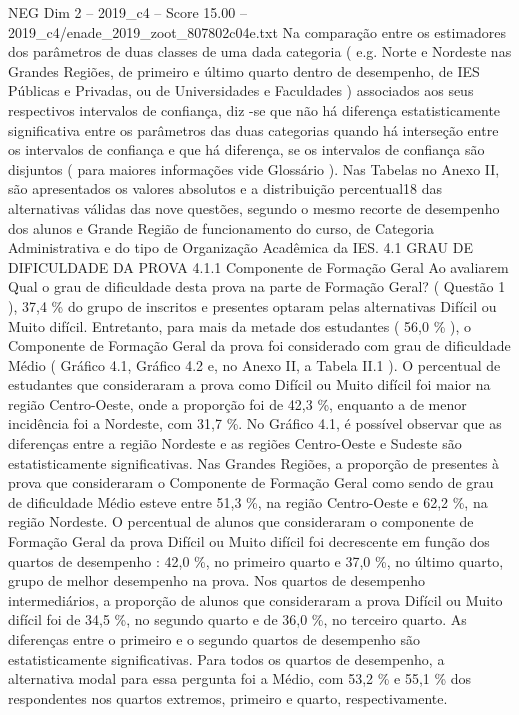 \begin{textsample}{NEG Dim 2 – 2019\_c4 – Score 15.00 – 2019\_c4/enade\_2019\_zoot\_807802c04e.txt}
Na comparação entre os estimadores dos parâmetros de duas classes de uma dada categoria ( e.g.
Norte e Nordeste nas Grandes Regiões, de primeiro e último quarto dentro de desempenho, de IES Públicas e Privadas, ou de Universidades e Faculdades ) associados aos seus respectivos intervalos de confiança, diz -se que não há diferença estatisticamente significativa entre os parâmetros das duas categorias quando há interseção entre os intervalos de confiança e que há diferença, se os intervalos de confiança são disjuntos ( para maiores informações vide Glossário ).
Nas Tabelas no Anexo II, são apresentados os valores absolutos e a distribuição percentual18 das alternativas válidas das nove questões, segundo o mesmo recorte de desempenho dos alunos e Grande Região de funcionamento do curso, de Categoria Administrativa e do tipo de Organização Acadêmica da IES. 4.1 GRAU DE DIFICULDADE DA PROVA 4.1.1 Componente de Formação Geral Ao avaliarem Qual o grau de dificuldade desta prova na parte de Formação Geral? ( Questão 1 ), 37,4 \% do grupo de inscritos e presentes optaram pelas alternativas Difícil ou Muito difícil.
Entretanto, para mais da metade dos estudantes ( 56,0 \% ), o Componente de Formação Geral da prova foi considerado com grau de dificuldade Médio ( Gráfico 4.1, Gráfico 4.2 e, no Anexo II, a Tabela II.1 ).
O percentual de estudantes que consideraram a prova como Difícil ou Muito difícil foi maior na região Centro-Oeste, onde a proporção foi de 42,3 \%, enquanto a de menor incidência foi a Nordeste, com 31,7 \%.
No Gráfico 4.1, é possível observar que as diferenças entre a região Nordeste e as regiões Centro-Oeste e Sudeste são estatisticamente significativas.
Nas Grandes Regiões, a proporção de presentes à prova que consideraram o Componente de Formação Geral como sendo de grau de dificuldade Médio esteve entre 51,3 \%, na região Centro-Oeste e 62,2 \%, na região Nordeste.
O percentual de alunos que consideraram o componente de Formação Geral da prova Difícil ou Muito difícil foi decrescente em função dos quartos de desempenho : 42,0 \%, no primeiro quarto e 37,0 \%, no último quarto, grupo de melhor desempenho na prova.
Nos quartos de desempenho intermediários, a proporção de alunos que consideraram a prova Difícil ou Muito difícil foi de 34,5 \%, no segundo quarto e de 36,0 \%, no terceiro quarto.
As diferenças entre o primeiro e o segundo quartos de desempenho são estatisticamente significativas.
Para todos os quartos de desempenho, a alternativa modal para essa pergunta foi a Médio, com 53,2 \% e 55,1 \% dos respondentes nos quartos extremos, primeiro e quarto, respectivamente.

\end{textsample}

